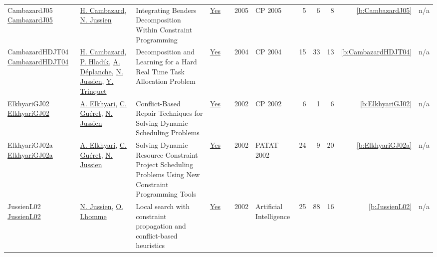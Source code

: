 {\begin{longtable}{>{\raggedright\arraybackslash}p{3cm}>{\raggedright\arraybackslash}p{6cm}>{\raggedright\arraybackslash}p{6.5cm}rrrp{2.5cm}rrrrr}
CambazardJ05 \href{https://doi.org/10.1007/11564751_58}{CambazardJ05} & \hyperref[auth:a1011]{H. Cambazard}, \hyperref[auth:a249]{N. Jussien} & Integrating Benders Decomposition Within Constraint Programming & \href{../works/CambazardJ05.pdf}{Yes} & \cite{CambazardJ05} & 2005 & CP 2005 & 5 & 6 & 8 & \ref{b:CambazardJ05} & n/a\\
CambazardHDJT04 \href{https://doi.org/10.1007/978-3-540-30201-8_14}{CambazardHDJT04} & \hyperref[auth:a1011]{H. Cambazard}, \hyperref[auth:a1075]{P. Hladik}, \hyperref[auth:a1076]{A. D{\'{e}}planche}, \hyperref[auth:a249]{N. Jussien}, \hyperref[auth:a1077]{Y. Trinquet} & Decomposition and Learning for a Hard Real Time Task Allocation Problem & \href{../works/CambazardHDJT04.pdf}{Yes} & \cite{CambazardHDJT04} & 2004 & CP 2004 & 15 & 33 & 13 & \ref{b:CambazardHDJT04} & n/a\\
ElkhyariGJ02 \href{https://doi.org/10.1007/3-540-46135-3_49}{ElkhyariGJ02} & \hyperref[auth:a294]{A. Elkhyari}, \hyperref[auth:a295]{C. Gu{\'{e}}ret}, \hyperref[auth:a249]{N. Jussien} & Conflict-Based Repair Techniques for Solving Dynamic Scheduling Problems & \href{../works/ElkhyariGJ02.pdf}{Yes} & \cite{ElkhyariGJ02} & 2002 & CP 2002 & 6 & 1 & 6 & \ref{b:ElkhyariGJ02} & n/a\\
ElkhyariGJ02a \href{https://doi.org/10.1007/978-3-540-45157-0_3}{ElkhyariGJ02a} & \hyperref[auth:a294]{A. Elkhyari}, \hyperref[auth:a295]{C. Gu{\'{e}}ret}, \hyperref[auth:a249]{N. Jussien} & Solving Dynamic Resource Constraint Project Scheduling Problems Using New Constraint Programming Tools & \href{../works/ElkhyariGJ02a.pdf}{Yes} & \cite{ElkhyariGJ02a} & 2002 & PATAT 2002 & 24 & 9 & 20 & \ref{b:ElkhyariGJ02a} & n/a\\
JussienL02 \href{http://dx.doi.org/10.1016/s0004-3702(02)00221-7}{JussienL02} & \hyperref[auth:a249]{N. Jussien}, \hyperref[auth:a1088]{O. Lhomme} & Local search with constraint propagation and conflict-based heuristics & \href{../works/JussienL02.pdf}{Yes} & \cite{JussienL02} & 2002 & Artificial Intelligence & 25 & 88 & 16 & \ref{b:JussienL02} & n/a\\
\end{longtable}
}

\clearpage

